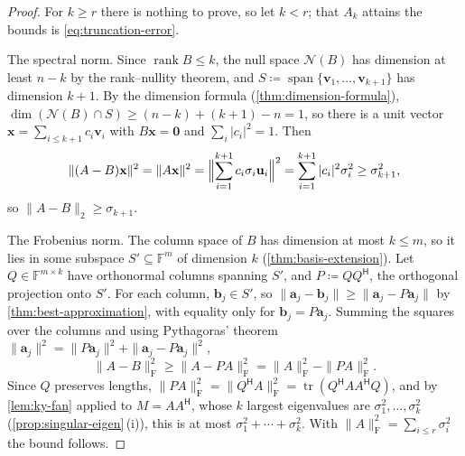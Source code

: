 \begin{proof}
For $k\ge r$ there is nothing to prove, so let $k<r$; that $A_k$ attains the bounds is \eqref{eq:truncation-error}.

The spectral norm. Since $\operatorname{rank}B\le k$, the null space $\mathcal N(B)$ has dimension at least $n-k$ by the rank--nullity theorem, and $S\coloneqq\operatorname{span}\{\mathbf v_1,\ldots,\mathbf v_{k+1}\}$ has dimension $k+1$. By the dimension formula (\cref{thm:dimension-formula}), $\dim(\mathcal N(B)\cap S)\ge(n-k)+(k+1)-n=1$, so there is a unit vector $\mathbf x=\sum_{i\le k+1}c_i\mathbf v_i$ with $B\mathbf x=\mathbf 0$ and $\sum_i|c_i|^2=1$. Then
\[
\|(A-B)\mathbf x\|^2=\|A\mathbf x\|^2=\Bigl\|\sum_{i=1}^{k+1}c_i\sigma_i\mathbf u_i\Bigr\|^2=\sum_{i=1}^{k+1}|c_i|^2\sigma_i^2\ge\sigma_{k+1}^2 ,
\]
so $\|A-B\|_2\ge\sigma_{k+1}$.

The Frobenius norm. The column space of $B$ has dimension at most $k\le m$, so it lies in some subspace $S'\subseteq\mathbb F^m$ of dimension $k$ (\cref{thm:basis-extension}). Let $Q\in\mathbb F^{m\times k}$ have orthonormal columns spanning $S'$, and $P\coloneqq QQ^{\mathsf H}$, the orthogonal projection onto $S'$. For each column, $\mathbf b_j\in S'$, so $\|\mathbf a_j-\mathbf b_j\|\ge\|\mathbf a_j-P\mathbf a_j\|$ by \cref{thm:best-approximation}, with equality only for $\mathbf b_j=P\mathbf a_j$. Summing the squares over the columns and using Pythagoras' theorem $\|\mathbf a_j\|^2=\|P\mathbf a_j\|^2+\|\mathbf a_j-P\mathbf a_j\|^2$,
\[
\|A-B\|_{\mathrm F}^2\ge\|A-PA\|_{\mathrm F}^2=\|A\|_{\mathrm F}^2-\|PA\|_{\mathrm F}^2 .
\]
Since $Q$ preserves lengths, $\|PA\|_{\mathrm F}^2=\|Q^{\mathsf H}A\|_{\mathrm F}^2=\operatorname{tr}(Q^{\mathsf H}AA^{\mathsf H}Q)$, and by \cref{lem:ky-fan} applied to $M=AA^{\mathsf H}$, whose $k$ largest eigenvalues are $\sigma_1^2,\ldots,\sigma_k^2$ (\cref{prop:singular-eigen}\,(i)), this is at most $\sigma_1^2+\cdots+\sigma_k^2$. With $\|A\|_{\mathrm F}^2=\sum_{i\le r}\sigma_i^2$ the bound follows.


\end{proof}
